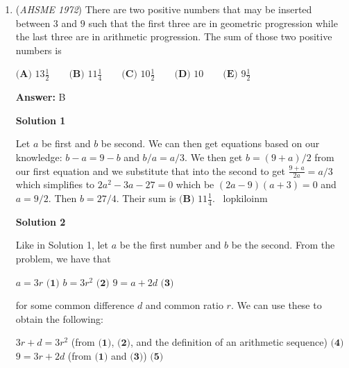 \begin{enumerate}
 $\textbf{(A) }500\qquad \textbf{(B) }550\qquad \textbf{(C) }900\qquad \textbf{(D) }950\qquad  \textbf{(E) }960$

 \textbf{Answer: }C



\textbf{Solution}

Every hour, the contractors lay $x/9$ and $x/10$ bricks, assuming a total of $x$ bricks in the wall. Together, $x/5$ bricks are laid per hour:
 \[x = 5(x/9 + x/10 - 10)\]There are a total of $x=900$ bricks, and the answer is $\textbf{(C)} \quad 900$.

 -edited by coolmath34

 


	\item (\textit{AHSME 1972}) There are two positive numbers that may be inserted between $3$ and $9$ such that the first three are in geometric progression 
while the last three are in arithmetic progression. The sum of those two positive numbers is


 $\textbf{(A) }13\textstyle\frac{1}{2}\qquad \textbf{(B) }11\frac{1}{4}\qquad \textbf{(C) }10\frac{1}{2}\qquad \textbf{(D) }10\qquad \textbf{(E) }9\frac{1}{2}$

 \textbf{Answer: }B



\textbf{Solution 1}

Let $a$ be first and $b$ be second. We can then get equations based on our knowledge: $b-a = 9-b$ and $b/a = a/3$. We then get $b = (9+a)/2$ from our first equation and we substitute that into the second to get $\frac{9+a}{2a} = a/3$ which simplifies to $2a^2-3a-27=0$ which be $(2a-9)(a+3) = 0$ and $a=9/2$. Then $b=27/4$. Their sum is $\boxed{\textbf{(B) }11\frac{1}{4}}$. ~lopkiloinm

 



\textbf{Solution 2}

Like in Solution 1, let $a$ be the first number and $b$ be the second. From the problem, we have that

 
$a = 3r$ $\textbf{(1)}$
$b = 3r^2$ $\textbf{(2)}$
$9 = a + 2d$ $\textbf{(3)}$

 
for some common difference $d$ and common ratio $r$. We can use these to obtain the following:

 
$3r + d = 3r^2$ (from $\textbf{(1)}$, $\textbf{(2)}$, and the definition of an arithmetic sequence) $\textbf{(4)}$
$9 = 3r + 2d$ (from $\textbf{(1)}$ and $\textbf{(3)}$) $\textbf{(5)}$


\end{enumerate}
